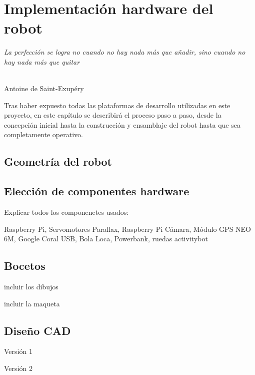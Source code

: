 \chapter{Implementación hardware del robot}
\label{cap:capitulo5}

\begin{flushright}
\begin{minipage}[]{10cm}
\emph{La perfección se logra no cuando no hay nada más que añadir, sino cuando no hay nada más que quitar}\\
\end{minipage}\\

Antoine de Saint-Exupéry\\
\end{flushright}

\vspace{1cm}

Tras haber expuesto todas las plataformas de desarrollo utilizadas en este proyecto, en este capítulo se describirá el proceso paso a paso, desde la concepción inicial hasta la construcción y ensamblaje del robot hasta que sea completamente operativo.

\section{Geometría del robot}



\section{Elección de componentes hardware}

Explicar todos los componenetes usados: 

Raspberry Pi, Servomotores Parallax, Raspberry Pi Cámara, Módulo GPS NEO 6M, Google Coral USB, Bola Loca, Powerbank, ruedas activitybot
\section{Bocetos}

incluir los dibujos

incluir la maqueta 

\section{Diseño CAD}

Versión 1 

Versión 2



